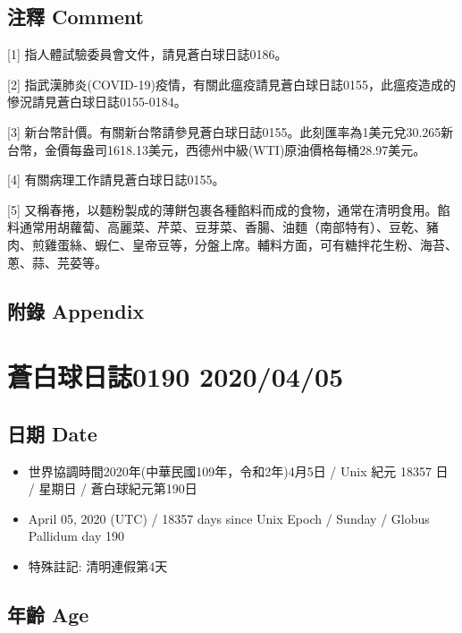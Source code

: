 \documentclass[
]{article}
\providecommand{\tightlist}{%
  \setlength{\itemsep}{0pt}\setlength{\parskip}{0pt}}
\begin{document}
\hypertarget{ux6ce8ux91cb-comment-3}{%
\subsection{注釋 Comment}\label{ux6ce8ux91cb-comment-3}}

{[}1{]} 指人體試驗委員會文件，請見蒼白球日誌0186。

{[}2{]}
指武漢肺炎(COVID-19)疫情，有關此瘟疫請見蒼白球日誌0155，此瘟疫造成的慘況請見蒼白球日誌0155-0184。

{[}3{]}
新台幣計價。有關新台幣請參見蒼白球日誌0155。此刻匯率為1美元兌30.265新台幣，金價每盎司1618.13美元，西德州中級(WTI)原油價格每桶28.97美元。

{[}4{]} 有關病理工作請見蒼白球日誌0155。

{[}5{]}
又稱春捲，以麵粉製成的薄餅包裹各種餡料而成的食物，通常在清明食用。餡料通常用胡蘿蔔、高麗菜、芹菜、豆芽菜、香腸、油麵（南部特有）、豆乾、豬肉、煎雞蛋絲、蝦仁、皇帝豆等，分盤上席。輔料方面，可有糖拌花生粉、海苔、蔥、蒜、芫荽等。

\hypertarget{ux9644ux9304-appendix-3}{%
\subsection{附錄 Appendix}\label{ux9644ux9304-appendix-3}}

\hypertarget{ux84bcux767dux7403ux65e5ux8a8c0190-20200405}{%
\section{蒼白球日誌0190
2020/04/05}\label{ux84bcux767dux7403ux65e5ux8a8c0190-20200405}}

\hypertarget{ux65e5ux671f-date-4}{%
\subsection{日期 Date}\label{ux65e5ux671f-date-4}}

\begin{itemize}
\tightlist
\item
  世界協調時間2020年(中華民國109年，令和2年)4月5日 / Unix 紀元 18357 日
  / 星期日 / 蒼白球紀元第190日
\item
  April 05, 2020 (UTC) / 18357 days since Unix Epoch / Sunday / Globus
  Pallidum day 190
\item
  特殊註記: 清明連假第4天
\end{itemize}

\hypertarget{ux5e74ux9f61-age-4}{%
\subsection{年齡 Age}\label{ux5e74ux9f61-age-4}}
\end{document}
